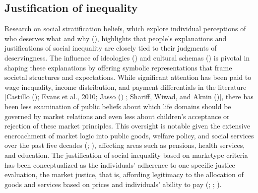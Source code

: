 \documentclass[
  letterpaper,
  DIV=11,
  numbers=noendperiod]{scrartcl}
\begin{document}
\subsection{Justification of
inequality}\label{justification-of-inequality}

Research on social stratification beliefs, which explore individual
perceptions of who deserves what and why
(),
highlights that people's explanations and justifications of social
inequality are closely tied to their judgments of deservingness. The
influence of ideologies () and cultural schemas
() is
pivotal in shaping these explanations by offering symbolic
representations that frame societal structures and expectations. While
significant attention has been paid to wage inequality, income
distribution, and payment differentials in the literature {[}Castillo
(); Evans et al., 2010;
Jasso () ; Shariff, Wiwad, and Aknin
(){]}, there has been less
examination of public beliefs about which life domains should be
governed by market relations and even less about children's acceptance
or rejection of these market principles. This oversight is notable given
the extensive encroachment of market logic into public goods, welfare
policy, and social services over the past five decades
(;
), affecting areas such as
pensions, health services, and education. The justification of social
inequality based on marketype criteria has been conceptualized as the
individuals' adherence to one specific justice evaluation, the market
justice, that is, affording legitimacy to the allocation of goods and
services based on prices and individuals' ability to pay
(;
;
).
\end{document}

